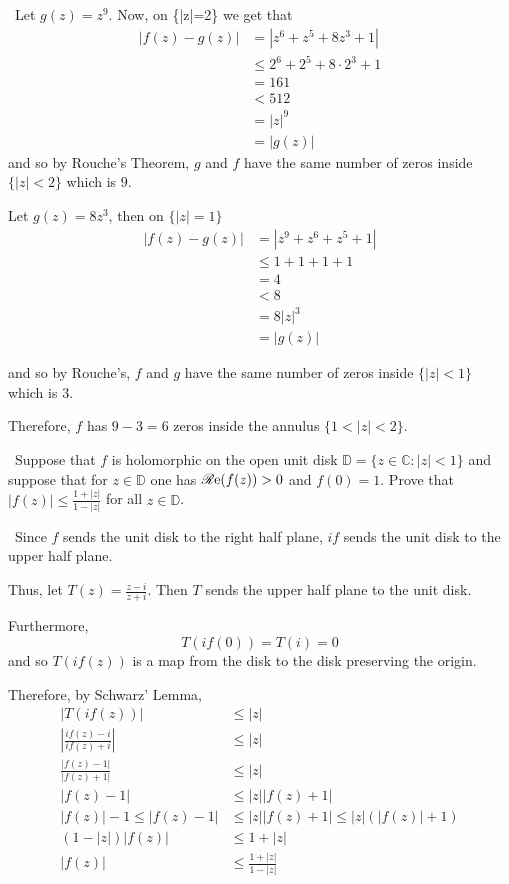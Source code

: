 \documentclass[12pt]{Qual}
\begin{document}
\begin{solution}$\,$
Let $g(z)=z^9$. Now, on \{|z|=2\} we get that \begin{align*}
    |f(z)-g(z)|&=|z^6+z^5+8z^3+1|\\
    &\le 2^6+2^5+8\cdot 2^3+1\\
    &=161\\
    &<512\\
    &=|z|^9\\
    &=|g(z)|
\end{align*} and so by Rouche's Theorem, $g$ and $f$ have the same number of zeros inside $\{|z|<2\}$ which is $9$.

Let $g(z)=8z^3$, then on $\{|z|=1\}$ \begin{align*}
    |f(z)-g(z)|&=|z^9+z^6+z^5+1|\\
    &\le 1+1+1+1\\
    &=4\\
    &<8\\
    &=8|z|^3\\
    &=|g(z)|
\end{align*}

and so by Rouche's, $f$ and $g$ have the same number of zeros inside $\{|z|<1\}$ which is $3.$

Therefore, $f$ has $9-3=6$ zeros inside the annulus $\{1<|z|<2\}.$
\end{solution}
\newpage




\begin{problem} $\,$
Suppose that $f$ is holomorphic on the open unit disk $\mathbb{D}=\{z\in\mathbb{C}:|z|<1\}$ and suppose that for $z\in\mathbb{D}$ one has $\mathscr{R}\text{e}(f(z))>0$ and $f(0)=1.$ Prove that $|f(z)|\le\frac{1+|z|}{1-|z|}$ for all $z\in\mathbb{D}$.
\end{problem}


\begin{solution}$\,$
Since $f$ sends the unit disk to the right half plane, $if$ sends the unit disk to the upper half plane.

Thus, let $T(z)=\frac{z-i}{z+i}$. Then $T$ sends the upper half plane to the unit disk.

Furthermore, $$T(if(0))=T(i)=0$$ and so $T(if(z))$ is a map from the disk to the disk preserving the origin.

Therefore, by Schwarz' Lemma, \begin{align*}
    |T(if(z))|&\le|z|\\
    \left|\frac{if(z)-i}{if(z)+i}\right|&\le|z|\\
    \frac{|f(z)-1|}{|f(z)+1|}&\le |z|\\
    |f(z)-1|&\le |z||f(z)+1|\\
    |f(z)|-1\le |f(z)-1|&\le |z||f(z)+1|\le |z|(|f(z)|+1)\\
    (1-|z|)|f(z)|&\le 1+|z|\\
    |f(z)|&\le\frac{1+|z|}{1-|z|}
\end{align*}
\end{solution}
\newpage
\end{document}
